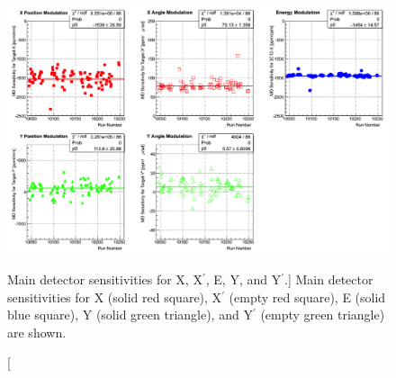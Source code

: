 \begin{singlespace}
\begin{figure}[!h]
	\begin{center}
	\includegraphics[width=15.0cm]{figures/BModSensitivities}
	\end{center}
	\caption
	[Main detector sensitivities for X, X$^\prime$, E, Y, and Y$^\prime$.]
	{Main detector sensitivities for X (solid red square), X$^\prime$ (empty red square), E (solid blue square), Y (solid green triangle), and Y$^\prime$ (empty green triangle) are shown. }
	\label{fig:BModSensitivities}
\end{figure}
\end{singlespace}


